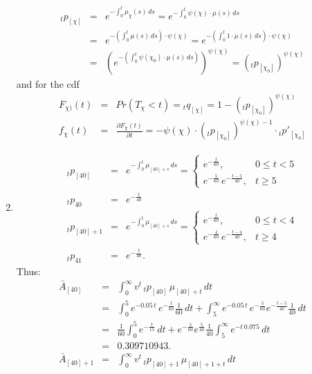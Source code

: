 \documentclass[11pt,fleqn,oneside]{book}
\begin{document}
\begin{enumerate}
\begin{eqnarray*}
{_tp_{[\chi]}} &=& e^{-\int_0^t \mu_\chi(s)\,ds} = e^{-\int_0^t\psi(\chi) \cdot \mu(s)\,ds}\\
&=& e^{-\left(\int_0^t \mu(s)\,ds\right) \cdot \psi(\chi)} = e^{-\left(\int_0^t 1\cdot \mu(s)\,ds\right) \cdot \psi(\chi)}\\
&=& \left(e^{-\left(\int_0^t \psi(\chi_0) \cdot \mu(s)\,ds\right)}\right)^{\psi(\chi)}
= (_tp_{[\chi_0]})^{\psi(\chi)}
\end{eqnarray*}
and for the cdf
\begin{eqnarray*}
F_{\chi)}(t) &=& Pr\left(T_\chi < t\right) = {_tq_{[\chi]}} = 1 - \left({_tp_{[\chi_0]}}\right)^{\psi(\chi)}\\
f_{\chi}(t) &=& \frac{\partial F_{\chi}(t)}{\partial t} = - \psi(\chi)\cdot \left({_tp_{[\chi_0]}}\right)^{\psi(\chi)-1}\cdot 
{_tp'_{[\chi_0]}}
\end{eqnarray*}
 \item \begin{eqnarray*}
{_tp_{[40]}} &=& e^{-\int_0^t \mu_{[40]+s}\,ds} = \left\{
\begin{array}{cl}
e^{-\frac{t}{60}},&0\leq t < 5\\
e^{-\frac{5}{60}}\,e^{-\frac{t-5}{40}},& t\geq 5
\end{array}
\right.\\
{_tp_{40}} &=& e^{-\frac{t}{40}} \\
{_tp_{[40]+1}} &=& e^{-\int_0^t \mu_{[40]+s}\,ds} = \left\{
\begin{array}{cl}
e^{-\frac{t}{60}},&0\leq t < 4\\
e^{-\frac{4}{60}}\,e^{-\frac{t-4}{40}},& t\geq 4
\end{array}
\right.\\
{_tp_{41}} &=& e^{-\frac{t}{40}}.
\end{eqnarray*}
Thus:
\begin{eqnarray*}
{\bar{A}_{[40]}} &=& \int_0^{\infty} v^t\,{_tp_{[40]}}\,\mu_{[40]+t}\,dt \\
&=& \int_0^5 e^{-0.05\,t}\,e^{-\frac{t}{60}} \frac{1}{60} \,dt + \int_5^\infty e^{-0.05\,t}\,e^{-\frac{5}{60}}e^{-\frac{t-5}{40}} \frac{1}{40} \,dt\\
&=& \frac{1}{60} \int_0^5 e^{-\frac{t}{15}}\,dt + e^{-\frac{5}{60}} e^{\frac{5}{40}} \frac{1}{40}
\int_5^{\infty} e^{-t\,0.075}\,dt\\
&=&0.309710943.\\
{\bar{A}_{[40]+1}} &=& \int_0^{\infty} v^t\,{_tp_{[40]+1}}\,\mu_{[40]+1+t}\,dt \\

\end{eqnarray*}
\end{enumerate}
\end{document}
